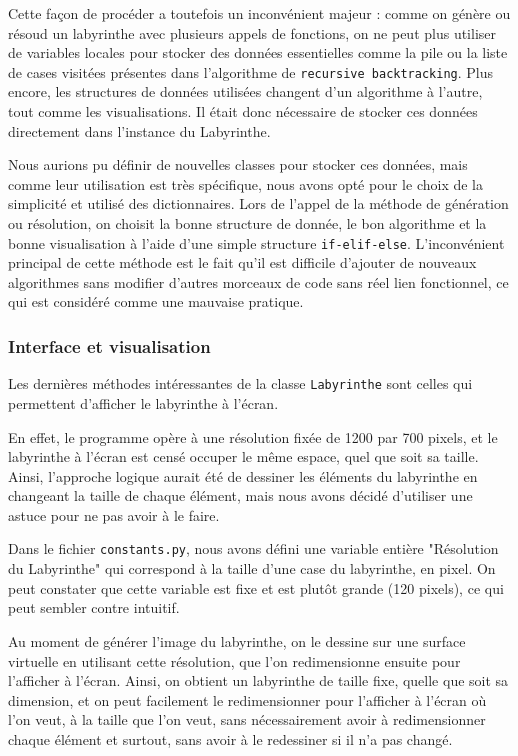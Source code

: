 \documentclass[12pt]{scrreprt} %
\begin{document}
Cette façon de procéder a toutefois un inconvénient majeur : comme on génère ou résoud un labyrinthe avec plusieurs appels de fonctions, on ne peut plus utiliser de variables locales pour stocker des données essentielles comme la pile ou la liste de cases visitées présentes dans l'algorithme de \texttt{recursive backtracking}. Plus encore, les structures de données utilisées changent d'un algorithme à l'autre, tout comme les visualisations. Il était donc nécessaire de stocker ces données directement dans l'instance du Labyrinthe.

Nous aurions pu définir de nouvelles classes pour stocker ces données, mais comme leur utilisation est très spécifique, nous avons opté pour le choix de la simplicité et utilisé des dictionnaires. Lors de l'appel de la méthode de génération ou résolution, on choisit la bonne structure de donnée, le bon algorithme et la bonne visualisation à l'aide d'une simple structure \texttt{if-elif-else}. L'inconvénient principal de cette méthode est le fait qu'il est difficile d'ajouter de nouveaux algorithmes sans modifier d'autres morceaux de code sans réel lien fonctionnel, ce qui est considéré comme une mauvaise pratique.

\subsubsection{Interface et visualisation}

Les dernières méthodes intéressantes de la classe \texttt{Labyrinthe} sont celles qui permettent d'afficher le labyrinthe à l'écran.

En effet, le programme opère à une résolution fixée de 1200 par 700 pixels, et le labyrinthe à l'écran est censé occuper le même espace, quel que soit sa taille. Ainsi, l'approche logique aurait été de dessiner les éléments du labyrinthe en changeant la taille de chaque élément, mais nous avons décidé d'utiliser une astuce pour ne pas avoir à le faire.

Dans le fichier \texttt{constants.py}, nous avons défini une variable entière "Résolution du Labyrinthe" qui correspond à la taille d'une case du labyrinthe, en pixel. On peut constater que cette variable est fixe et est plutôt grande (120 pixels), ce qui peut sembler contre intuitif.

Au moment de générer l'image du labyrinthe, on le dessine sur une surface virtuelle en utilisant cette résolution, que l'on redimensionne ensuite pour l'afficher à l'écran. Ainsi, on obtient un labyrinthe de taille fixe, quelle que soit sa dimension, et on peut facilement le redimensionner pour l'afficher à l'écran où l'on veut, à la taille que l'on veut, sans nécessairement avoir à redimensionner chaque élément et surtout, sans avoir à le redessiner si il n'a pas changé.
\end{document}
